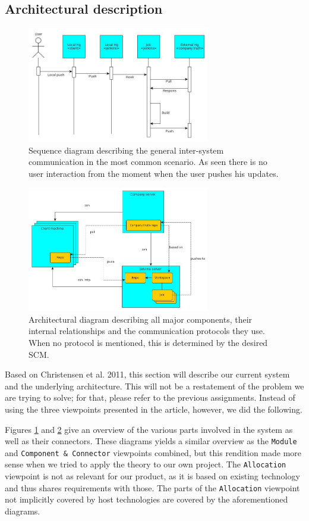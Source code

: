 \documentclass[a4paper,11pt]{article}
\begin{document}
\subsection{Architectural description}
\begin{figure}[!ht]
	\centering
	\includegraphics[width=8cm]{../graphs/sequence_diagram.jpg}
	\caption{Sequence diagram describing the general inter-system communication
	in the most common scenario. As seen there is no user interaction from the
	moment when the user pushes his updates.}
	\label{fig:dia_sequence}
\end{figure}
\begin{figure}[!ht]
	\centering
	\includegraphics[width=8cm]{../graphs/architecture_01.jpg}
	\caption{Architectural diagram describing all major components, their
	internal relationships and the communication protocols they use. When no
	protocol is mentioned, this is determined by the desired SCM.}
	\label{fig:dia_architecture}
\end{figure}

Based on Christensen et al. 2011, this section will describe our current
system and the underlying architecture. This will not be a restatement of the
problem we are trying to solve; for that, please refer to the previous assignments.
Instead of using the three viewpoints presented in the article, however, we did
the following.

Figures \ref{fig:dia_sequence} and \ref{fig:dia_architecture} give an overview of
the various parts involved in the system as well as their connectors. These
diagrams yields a similar overview as the \texttt{Module} and
\texttt{Component \& Connector} viewpoints combined, but this rendition made more
sense when we tried to apply the theory to our own project. The \texttt{Allocation}
viewpoint is not as relevant for our product, as it is based on existing technology
and thus shares requirements with those. The parts of the \texttt{Allocation} viewpoint
not implicitly covered by host technologies are covered by the aforementioned diagrams.
\end{document}
